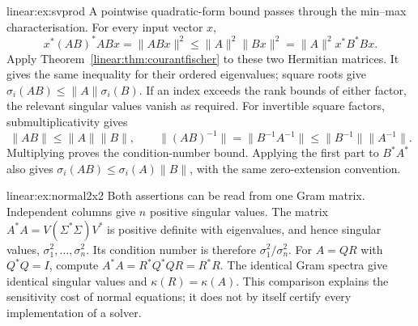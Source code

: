 \begin{solution}{linear:ex:svprod}
\idea A pointwise quadratic-form bound passes through the min--max characterisation.
\writeup For every input vector $x$,
\[
x^*(AB)^*ABx=\|ABx\|^2\le\|A\|^2\|Bx\|^2=\|A\|^2x^*B^*Bx.
\]
Apply Theorem~\ref{linear:thm:courantfischer} to these two Hermitian matrices. It gives the same inequality for their ordered eigenvalues; square roots give $\sigma_i(AB)\le\|A\|\sigma_i(B)$. If an index exceeds the rank bounds of either factor, the relevant singular values vanish as required. For invertible square factors, submultiplicativity gives
\[
\|AB\|\le\|A\|\|B\|,\qquad
\|(AB)^{-1}\|=\|B^{-1}A^{-1}\|\le\|B^{-1}\|\|A^{-1}\|.
\]
Multiplying proves the condition-number bound. Applying the first part to $B^*A^*$ also gives $\sigma_i(AB)\le\sigma_i(A)\|B\|$, with the same zero-extension convention.
\end{solution}

\begin{solution}{linear:ex:normal2x2}
\idea Both assertions can be read from one Gram matrix.
\writeup Independent columns give $n$ positive singular values. The matrix $A^*A=V(\Sigma^*\Sigma)V^*$ is positive definite with eigenvalues, and hence singular values, $\sigma_1^2,\ldots,\sigma_n^2$. Its condition number is therefore $\sigma_1^2/\sigma_n^2$.
For $A=QR$ with $Q^*Q=I$, compute $A^*A=R^*Q^*QR=R^*R$. The identical Gram spectra give identical singular values and $\kappa(R)=\kappa(A)$. This comparison explains the sensitivity cost of normal equations; it does not by itself certify every implementation of a solver.
\end{solution}

